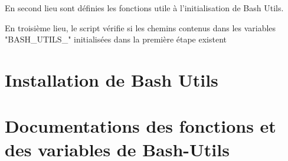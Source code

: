 \documentclass[a4paper,10pt]{article}
\begin{document}
En second lieu sont définies les fonctions utile à l'initialisation de Bash Utils.

En troisième lieu, le script vérifie si les chemins contenus dans les variables "BASH_UTILS_"  initialisées dans la première étape existent

\section{Installation de Bash Utils}

\section{Documentations des fonctions et des variables de Bash-Utils}
\end{document}
